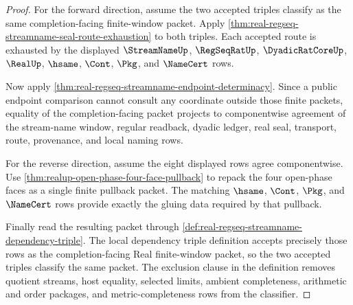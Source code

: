 \begin{proof}
For the forward direction, assume the two accepted triples classify as the
same completion-facing finite-window packet. Apply
\autoref{thm:real-regseq-streamname-seal-route-exhaustion} to both triples.
Each accepted route is exhausted by the displayed $\StreamNameUp$,
$\RegSeqRatUp$, $\DyadicRatCoreUp$, $\RealUp$, $\hsame$, $\Cont$, $\Pkg$, and
$\NameCert$ rows.

Now apply \autoref{thm:real-regseq-streamname-endpoint-determinacy}. Since a
public endpoint comparison cannot consult any coordinate outside those finite
packets, equality of the completion-facing packet projects to componentwise
agreement of the stream-name window, regular readback, dyadic ledger, real
seal, transport, route, provenance, and local naming rows.

For the reverse direction, assume the eight displayed rows agree
componentwise. Use
\autoref{thm:realup-open-phase-four-face-pullback} to repack the four
open-phase faces as a single finite pullback packet. The matching $\hsame$,
$\Cont$, $\Pkg$, and $\NameCert$ rows provide exactly the gluing data required
by that pullback.

Finally read the resulting packet through
\autoref{def:real-regseq-streamname-dependency-triple}. The local dependency
triple definition accepts precisely those rows as the completion-facing Real
finite-window packet, so the two accepted triples classify the same packet.
The exclusion clause in the definition removes quotient streams, host
equality, selected limits, ambient completeness, arithmetic and order packages,
and metric-completeness rows from the classifier.
\end{proof}

